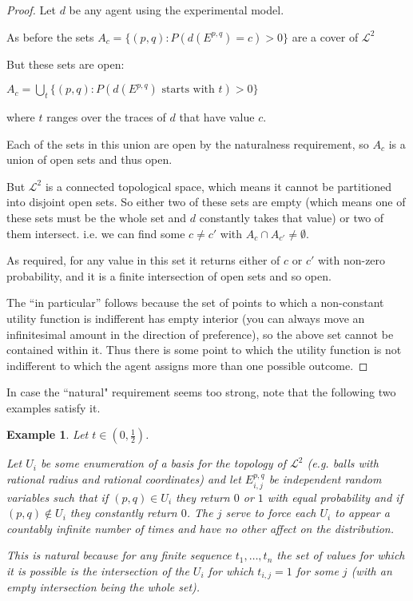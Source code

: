 \documentclass[a4paper]{book}
\newtheorem{example}{Example}[section]
\begin{document}
\begin{proof}
Let $d$ be any agent using the experimental model. 

As before the sets
$A_c = \{(p, q): P(d(E^{p, q}) = c) > 0\}$
are a cover of $\mathcal{L}^2$

But these sets are open:

$A_c = \bigcup\limits_t \{(p, q): P(d(E^{p, q}) \text{ starts with $t$}) > 0\}$

where $t$
ranges over the traces of $d$
that have value $c$.

Each of the sets in this union are open by the naturalness requirement,
so $A_c$ is a union of open sets and thus open.

But $\mathcal{L}^2$
is a connected topological space, which means it cannot
be partitioned into disjoint open sets. So either two of these sets are empty
(which means one of these sets must be the whole set and $d$
constantly takes that value) or two of them intersect. i.e. we can find some
$c \neq c'$
with $A_c \cap A_{c'} \neq \emptyset$.

As required, for any value in this set it returns either of $c$
or $c'$
with non-zero probability, and it is a finite intersection of open sets
and so open.

The ``in particular'' follows because the set of points to which a non-constant
utility function  is indifferent has empty interior (you can always move
an infinitesimal amount in the direction of preference), so the
above set cannot be contained within it. Thus there is some point
to which the utility function is not indifferent to which the agent assigns
more than one possible outcome.
\end{proof}

In case the ``natural" requirement seems too strong, note that the following
two examples satisfy it.

\begin{example}
Let $t \in (0, \frac{1}{2})$.

Let $U_i$
be some enumeration of a basis for the topology of $\mathcal{L}^2$
(e.g. balls with rational radius and rational coordinates)
and let $E^{p, q}_{i, j}$
be independent random variables such that if $(p, q) \in U_i$
they return $0$ or $1$
with equal probability
and if $(p, q) \not\in U_i$
they constantly return $0$.
The $j$ serve to force each $U_i$ to appear a countably infinite
number of times and have no other affect on the distribution.

This is natural because for any finite sequence $t_1, \ldots, t_n$
the set of values for which it is possible is the intersection of
the $U_i$
for which $t_{i, j} = 1$
for some $j$
(with an empty intersection being the whole set).
\end{example}
\end{document}
